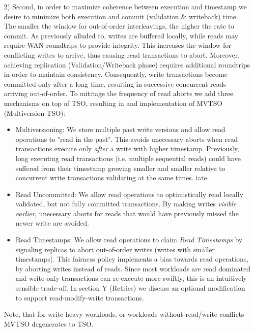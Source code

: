 2) Second, in order to maximize coherence between execution and timestamp we desire to minimize both execution and commit (validation \& writeback) time. The smaller the window for out-of-order interleavings, the higher the rate to commit. As previously alluded to, writes are buffered locally, while reads may require WAN roundtrips to provide integrity. This increases the window for conflicting writes to arrive, thus causing read transactions to abort.
Moreover, achieving replication (Validation/Writeback phase) requires additional roundtrips in order to maintain consistency. Consequently, write transactions become committed only after a long time, resulting in successive concurrent reads arriving out-of-order.
To mititage the frequency of read aborts we add three mechanisms on top of TSO, resulting in and implementation of MVTSO (Multiversion TSO):
\begin{itemize}
\item Multiversioning: We store multiple past write versions and allow read operations to "read in the past". This avoids unecessary aborts when read transactions execute only \textit{after} a write with higher timestamp. Previously, long executing read transactions (i.e. multiple sequential reads) could have suffered from their timestamp growing smaller and smaller relative to concurrent write transactions validating at the same times. iate
\item Read Uncommitted: We allow read operations to optimistically read locally validated, but not fully committed transactions. By making writes \textit{visible earlier}, unecessary aborts for reads that would have previously missed the newer write are avoided.
\item Read Timestamps: We allow read operations to claim \textit{Read Timestamps} by signaling replicas to abort out-of-order writes (writes with smaller timestamps). This fairness policy implements a bias towards read operations, by aborting writes instead of reads. Since most workloads are read dominated and write-only transactions can re-execute more swiftly, this is an intuitively sensible trade-off. In section Y (Retries) 	we discuss an optional modification to support read-modify-write transactions. 
\end{itemize}


Note, that for write heavy workloads, or workloads without read/write conflicts MVTSO degenerates to TSO.

